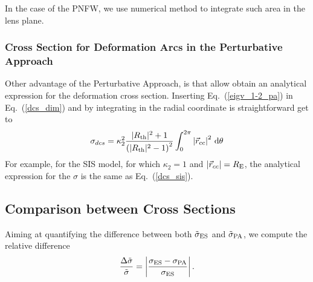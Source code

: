 \documentclass[useAMS,usenatbib]{mn2e}
\begin{document}
In the case of the PNFW, we use numerical method to integrate such area in the lens plane.



\subsubsection{Cross Section for Deformation Arcs in the Perturbative Approach}
Other advantage of the Perturbative Approach, is that allow obtain an analytical expression for the deformation cross section. Inserting Eq.~(\ref{eigv_1-2_pa}) in Eq.~(\ref{dcs_dim}) and by integrating in the radial coordinate is straightforward get to
\begin{equation}
\sigma_{dcs}=\kappa_2^2\frac{|R_{\rm th}|^2+1}{\left(|R_{\rm th}|^2-1\right)^2}\int_0^{2\pi}\left|\vec{
r}_{\mathrm{cc}}\right|^2\,{\rm d}\theta\label{sec-choq-pert-app2}
\end{equation}
For example, for the SIS model, for which $\kappa_2=1$ and $|\vec{r}_{cc}|=R_{\rm E}$, the analytical expression for the $\sigma$ is the same as Eq.~(\ref{dcs_sis}).

\subsection{Comparison between Cross Sections}

Aiming at quantifying the difference between both $\tilde{\sigma}_{\rm ES}$ and $\tilde{\sigma}_{\rm PA}$, we compute the relative difference
\begin{equation}
\frac{\Delta \tilde{\sigma}}{\tilde{\sigma}}=\left|\frac{\sigma_{\rm ES}-\sigma_{\rm PA}}{\sigma_{\rm ES}} \right|\label{dif_rela_sigma}.
\end{equation}
\end{document}
